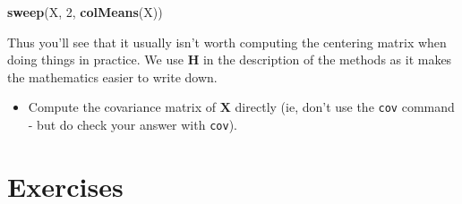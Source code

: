 \documentclass[
]{book}
\newenvironment{Shaded}{\begin{snugshade}}{\end{snugshade}}
\newcommand{\DecValTok}[1]{\textcolor[rgb]{0.00,0.00,0.81}{#1}}
\newcommand{\FunctionTok}[1]{\textcolor[rgb]{0.13,0.29,0.53}{\textbf{#1}}}
\newcommand{\NormalTok}[1]{#1}
\providecommand{\tightlist}{%
  \setlength{\itemsep}{0pt}\setlength{\parskip}{0pt}}
\theoremstyle{definition}
\theoremstyle{definition}
\theoremstyle{definition}
\theoremstyle{definition}
\theoremstyle{remark}
\begin{document}
\begin{Shaded}
\begin{Highlighting}[]
\FunctionTok{sweep}\NormalTok{(X, }\DecValTok{2}\NormalTok{, }\FunctionTok{colMeans}\NormalTok{(X))}
\end{Highlighting}
\end{Shaded}

Thus you'll see that it usually isn't worth computing the centering matrix when doing things in practice. We use \(\mathbf H\) in the description of the methods as it makes the mathematics easier to write down.

\begin{itemize}
\tightlist
\item
  Compute the covariance matrix of \(\mathbf X\) directly (ie, don't use the \texttt{cov} command - but do check your answer with \texttt{cov}).
\end{itemize}

\hypertarget{exercises-ch2}{%
\section{Exercises}\label{exercises-ch2}}
\end{document}
